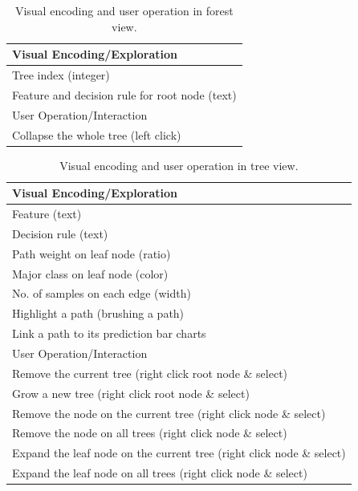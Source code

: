\documentclass{chi2009}
\begin{document}
\begin{table}[ht]
\caption{Visual encoding and user operation in forest view.}
\begin{center}
\begin{tabular}{|l|}
\hline
Visual Encoding/Exploration\\
\hline
Tree index (integer)\\
Feature and decision rule for root node (text)\\
\hline
\hline 
User Operation/Interaction\\
\hline
Collapse the whole tree (left click)\\
\hline
\end{tabular}
\end{center}
\end{table}

\begin{table}[ht]\small
\caption{Visual encoding and user operation in tree view.}
\begin{center}
\begin{tabular}{|l|}
\hline
Visual Encoding/Exploration\\
\hline
Feature (text)\\
Decision rule (text)\\
Path weight on leaf node (ratio)\\
Major class on leaf node (color)\\
No. of samples on each edge (width)\\
Highlight a path (brushing a path)\\
Link a path to its prediction bar charts\\
\hline
\hline 
User Operation/Interaction\\
\hline
Remove the current tree (right click root node \& select)\\
Grow a new tree (right click root node \& select)\\
Remove the node on the current tree (right click node \& select)\\
Remove the node on all trees (right click node \& select)\\
Expand the leaf node on the current tree (right click node \& select)\\
Expand the leaf node on all trees (right click node \& select)\\
\hline
\end{tabular}
\end{center}
\end{table}
\normalsize
\end{document}
